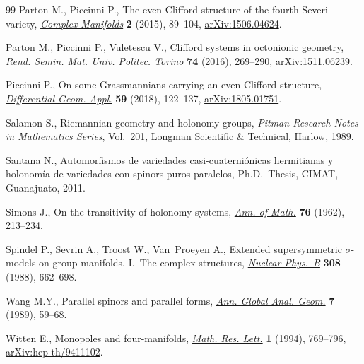 \begin{thebibliography}{99}
Parton M., Piccinni P., The even {C}lifford structure of the fourth {S}everi
 variety, \href{https://doi.org/10.1515/coma-2015-0008}{\textit{Complex Manifolds}} \textbf{2} (2015), 89--104,
 \href{https://arxiv.org/abs/1506.04624}{arXiv:1506.04624}.

Parton M., Piccinni P., Vuletescu V., Clifford systems in octonionic geometry,
 \textit{Rend. Semin. Mat. Univ. Politec. Torino} \textbf{74} (2016),
 269--290, \href{https://arxiv.org/abs/1511.06239}{arXiv:1511.06239}.

Piccinni P., On some {G}rassmannians carrying an even {C}lifford structure,
 \href{https://doi.org/10.1016/j.difgeo.2018.04.007}{\textit{Differential Geom. Appl.}} \textbf{59} (2018), 122--137,
 \href{https://arxiv.org/abs/1805.01751}{arXiv:1805.01751}.

Salamon S., Riemannian geometry and holonomy groups, \textit{Pitman Research
 Notes in Mathematics Series}, Vol.~201, Longman Scientific \& Technical,
 Harlow, 1989.

Santana N., Automorfismos de variedades casi-cuaterni\'onicas hermitianas y holonom\'ia de variedades con spinors puros paralelos, Ph.D.~Thesis, CIMAT, Guanajuato, 2011.

Simons J., On the transitivity of holonomy systems, \href{https://doi.org/10.2307/1970273}{\textit{Ann. of Math.}}
 \textbf{76} (1962), 213--234.

Spindel P., Sevrin A., Troost W., Van~Proeyen A., Extended supersymmetric
 {$\sigma$}-models on group manifolds. {I}.~{T}he complex structures,
 \href{https://doi.org/10.1016/0550-3213(88)90582-2}{\textit{Nuclear Phys.~B}} \textbf{308} (1988), 662--698.

Wang M.Y., Parallel spinors and parallel forms, \href{https://doi.org/10.1007/BF00137402}{\textit{Ann. Global Anal.
 Geom.}} \textbf{7} (1989), 59--68.

Witten E., Monopoles and four-manifolds, \href{https://doi.org/10.4310/MRL.1994.v1.n6.a13}{\textit{Math. Res. Lett.}} \textbf{1}
 (1994), 769--796, \href{https://arxiv.org/abs/hep-th/9411102}{arXiv:hep-th/9411102}.

\end{thebibliography}\LastPageEnding

